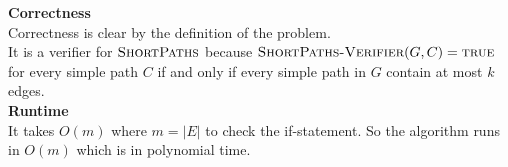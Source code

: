 \documentclass[11pt]{article}
\begin{document}
\begin{enumerate}
\begin{enumerate}
\begin{codebox}
\end{codebox}
{\bf Correctness}\\
Correctness is clear by the definition of the problem.\\
It is a verifier for $\textnormal{\scshape ShortPaths}$ because $\textnormal{\scshape ShortPaths-Verifier}(G, C) = \textnormal{\scshape true}$ for every simple path $C$ if and only if every simple path in $G$ contain at most $k$ edges.\\
{\bf Runtime}\\
It takes $O(m)$ where $m = |E|$ to check the if-statement. So the algorithm runs in $O(m)$ which is in polynomial time.
\end{enumerate}
\end{enumerate}
\end{document}
